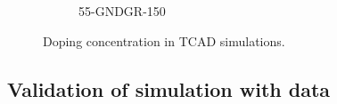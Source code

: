 \begin{figure}[htbp]
\begin{subfigure}[b]{0.5\linewidth}
    \caption{55-GNDGR-150}
  \end{subfigure}
  \caption{Doping concentration in TCAD simulations.}
  \label{fig:TCAD_dopingConcentration}
\end{figure}

\subsection{Validation of simulation with data}

